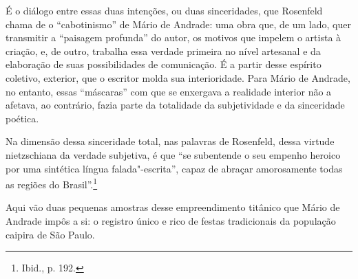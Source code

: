 É o diálogo entre essas duas intenções, ou duas sinceridades, que Rosenfeld chama de o ``cabotinismo'' de Mário de Andrade: uma obra que, de um lado, quer transmitir a ``paisagem profunda'' do autor, os motivos que impelem o artista à criação, e, de outro, trabalha essa verdade primeira no nível artesanal e da elaboração de suas possibilidades de comunicação. É a partir desse espírito coletivo, exterior,
que o escritor molda sua interioridade. Para Mário de Andrade, no entanto, essas ``máscaras'' com que se enxergava a realidade interior não a afetava, ao contrário, fazia parte da totalidade da subjetividade e da sinceridade poética.

Na dimensão dessa sinceridade total, nas palavras de Rosenfeld, dessa virtude nietzschiana da verdade subjetiva, é que ``se subentende o seu empenho heroico por uma sintética língua falada"-escrita'', capaz de abraçar amorosamente todas as regiões do Brasil''.\footnote{Ibid., p. 192.}

Aqui vão duas pequenas amostras desse empreendimento titânico que Mário de Andrade impôs a si: o registro único e rico de festas tradicionais da população caipira de São Paulo.
